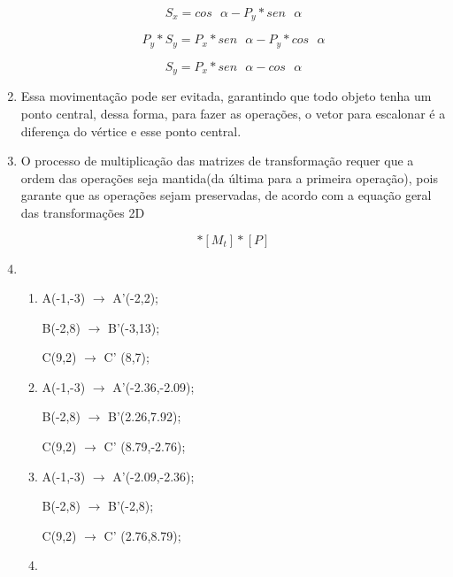 \begin{enumerate}[label=\arabic*)]
	\begin{equation*}
		S_x = cos \text{ } \alpha - P_y * sen \text{ } \alpha
	\end{equation*}
	
	\begin{equation}
		P_y * S_y = P_x * sen \text{ } \alpha - P_y * cos \text{ } \alpha
	\end{equation}
	
	\begin{equation*}
		S_y = P_x * sen \text{ } \alpha - cos \text{ } \alpha
	\end{equation*}
		\item 
		Essa  movimentação pode ser evitada, garantindo que todo objeto tenha um 
		ponto central, dessa forma, para fazer as operações, o vetor para escalonar é a diferença do
		vértice e esse ponto central.
		
		\item 
		O processo de multiplicação das matrizes de transformação requer que a ordem das    operações seja mantida(da última para a primeira operação), pois garante que as operações
sejam preservadas, de acordo com a equação geral das transformações 2D

       \begin{equation}
         [P'] * [M_t] * [P]
       \end{equation}

		\item 
				
				\begin{enumerate}[label=\alph*.]
				   \setlength\itemsep{1em}
					\item					
					   				
					   				A(-1,-3) $\rightarrow$ A'(-2,2);
				
									B(-2,8)  $\rightarrow$ B'(-3,13);
				
									C(9,2)  $\rightarrow$ C' (8,7);
					\item 
					
								    A(-1,-3) $\rightarrow$ A'(-2.36,-2.09);
				
									B(-2,8)  $\rightarrow$ B'(2.26,7.92);
				
									C(9,2)  $\rightarrow$ C' (8.79,-2.76);
					\item 
					
									A(-1,-3) $\rightarrow$ A'(-2.09,-2.36);
				
									B(-2,8)  $\rightarrow$ B'(-2,8);
				
									C(9,2)  $\rightarrow$ C' (2.76,8.79);
					\item
					

\end{enumerate}
\end{enumerate}
